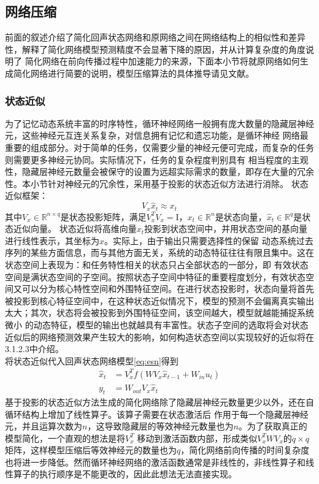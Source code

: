 \subsection{网络压缩}
前面的叙述介绍了简化回声状态网络和原网络之间在网络结构上的相似性和差异性，解释了简化网络模型预测精度不会显著下降的原因，并从计算复杂度的角度说明了
简化网络在前向传播过程中加速能力的来源，下面本小节将就原网络如何生成简化网络进行简要的说明，模型压缩算法的具体推导请见文献。
\subsubsection{状态近似}
为了记忆动态系统丰富的时序特性，循环神经网络一般拥有庞大数量的隐藏层神经元，这些神经元互连关系复杂，对信息拥有记忆和遗忘功能，是循环神经
网络最重要的组成部分。对于简单的任务，仅需要少量的神经元便可完成，而复杂的任务则需要更多神经元协同。实际情况下，任务的复杂程度判别具有
相当程度的主观性，隐藏层神经元数量会被保守的设置为远超实际需求的数量，即存在大量的冗余性。本小节针对神经元的冗余性，采用基于投影的状态近似方法进行消除。
状态近似框架：
\begin{equation}
	V_x \widehat{x}_{t} \approx x_{t}
\end{equation}
其中\(V_x \in \mathbb{R}^{n \times q}\)是状态投影矩阵，满足\(V_x^T  V_x = \mathrm{I}\)，\(x_{t} \in \mathbb{R}^n\)是状态向量，\(\widehat{x}_t \in \mathbb{R}^q\)是状态近似向量。
状态近似将高维向量\(x_t\)投影到状态空间中，并用状态空间的基向量进行线性表示，其坐标为\(\widehat{x}\)。实际上，由于输出只需要选择性的保留
动态系统过去序列的某些方面信息，而与其他方面无关，系统的动态特征往往有限且集中。这在状态空间上表现为：和任务特性相关的状态只占全部状态的一部分，即
有效状态空间是满状态空间的子空间。按照状态子空间中特征的重要程度划分，有效状态空间又可以分为核心特性空间和外围特征空间。在进行状态投影时，状态向量将首先
被投影到核心特征空间中，在这种状态近似情况下，模型的预测不会偏离真实输出太大；其次，状态将会被投影到外围特征空间，该空间越大，模型就越能捕捉系统微小
的动态特征，模型的输出也就越具有丰富性。状态子空间的选取将会对状态近似后的网络预测效果产生较大的影响，如何构造状态空间以实现较好的近似将在3.1.2.3中介绍。\\
将状态近似代入回声状态网络模型\ref{eq:esn}得到
\begin{equation}
	\begin{split}
		\widehat{x}_{t} & = V_x^T  f(W V_x  \widehat{x}_{t-1} + W_{in}  u_t)	\\
					y_t & = W_{out} V_x  \widehat{x}_t
	\end{split}
\end{equation}
基于投影的状态近似方法生成的简化网络除了隐藏层神经元数量更少以外，还在自循环结构上增加了线性算子。该算子需要在状态激活后
作用于每一个隐藏层神经元，并且运算次数为\(n\)，这导致隐藏层的等效神经元数量也为\(n\)。为了获取真正的模型简化，一个直观的想法是将\(V_x^T\)
移动到激活函数内部，形成类似\(V_x^T  W  V_x\)的\(q \times q\)矩阵，这样模型压缩后等效神经元的数量也为\(q\)，简化网络前向传播的时间复杂度
也将进一步降低。然而循环神经网络的激活函数通常是非线性的，非线性算子和线性算子的执行顺序是不能更改的，因此此想法无法直接实现。

